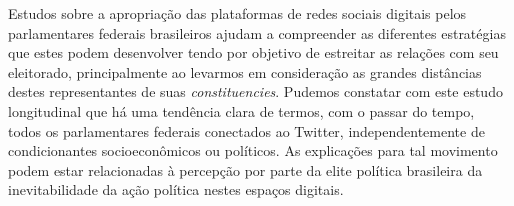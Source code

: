 Estudos sobre a apropriação das plataformas de redes sociais digitais
pelos parlamentares federais brasileiros ajudam a compreender as
diferentes estratégias que estes podem desenvolver tendo por objetivo de
estreitar as relações com seu eleitorado, principalmente ao levarmos em
consideração as grandes distâncias destes representantes de suas
\emph{constituencies}. Pudemos constatar com este estudo longitudinal
que há uma tendência clara de termos, com o passar do tempo, todos os
parlamentares federais conectados ao Twitter, independentemente de
condicionantes socioeconômicos ou políticos. As explicações para tal
movimento podem estar relacionadas à percepção por parte da elite
política brasileira da inevitabilidade da ação política nestes espaços
digitais.



